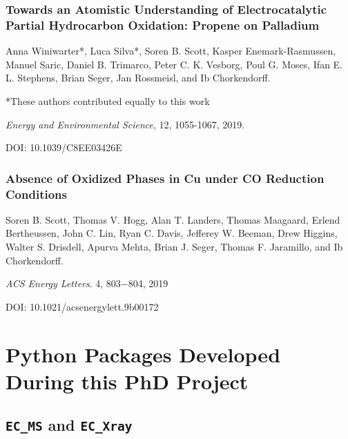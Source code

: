 \begin{appendices}
		
	\subsection{Towards an Atomistic Understanding of Electrocatalytic Partial Hydrocarbon Oxidation: Propene on Palladium}\label{Winiwarter2019}
	
	Anna Winiwarter*, Luca Silva*, Soren B. Scott, Kasper Enemark-Rasmussen, Manuel Saric, Daniel B. Trimarco, Peter C. K. Vesborg, Poul G. Moses, Ifan E. L. Stephens, Brian Seger, Jan Rossmeisl, and Ib Chorkendorff.
	
	*These authors contributed equally to this work
	
	\textit{Energy and Environmental Science}, 12, 1055-1067, 2019.
	
	DOI:  10.1039/C8EE03426E
	
	

	
	\subsection{Absence of Oxidized Phases in Cu under CO Reduction Conditions}\label{Scott2019_GIXRD}
	
	Soren B. Scott, Thomas V. Hogg, Alan T. Landers, Thomas Maagaard, Erlend Bertheussen, John C. Lin, Ryan C. Davis, Jefferey W. Beeman, Drew Higgins, Walter S. Drisdell, Apurva Mehta, Brian J. Seger, Thomas F. Jaramillo, and Ib Chorkendorff.
	
	\textit{ACS Energy Letters}. 4, 803−804, 2019
	
	DOI: 10.1021/acsenergylett.9b00172 
	
	

	
	\chapter{Python Packages Developed During this PhD Project}
		\section{\texttt{EC\_MS} and \texttt{EC\_Xray}}
\end{appendices}